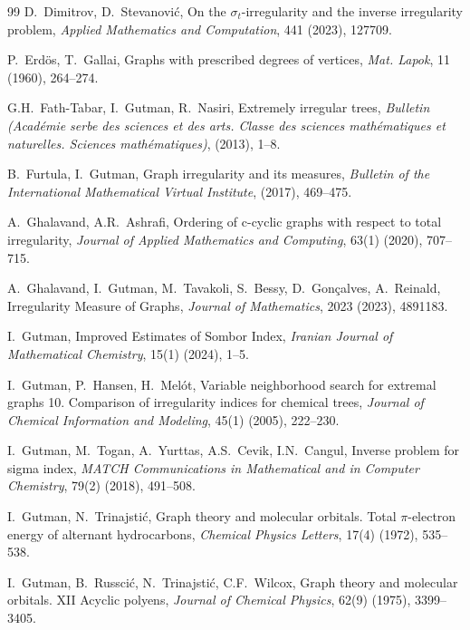 \documentclass[12pt]{amsart}
\begin{document}
\begin{thebibliography}{99}
D.~Dimitrov, D.~Stevanovi\'c,
\newblock On the $\sigma_t$-irregularity and the inverse irregularity problem,
\newblock \emph{Applied Mathematics and Computation}, 441 (2023), 127709.

P.~Erd\"{o}s, T.~Gallai,
\newblock Graphs with prescribed degrees of vertices,
\newblock \emph{Mat. Lapok}, 11 (1960), 264–274.

G.H.~Fath-Tabar, I.~Gutman, R.~Nasiri,
\newblock Extremely irregular trees,
\newblock \emph{Bulletin (Académie serbe des sciences et des arts. Classe des sciences mathématiques et naturelles. Sciences mathématiques)}, (2013), 1–8.

B.~Furtula, I.~Gutman,
\newblock Graph irregularity and its measures,
\newblock \emph{Bulletin of the International Mathematical Virtual Institute}, (2017), 469–475.

A.~Ghalavand, A.R.~Ashrafi,
\newblock Ordering of c-cyclic graphs with respect to total irregularity,
\newblock \emph{Journal of Applied Mathematics and Computing}, 63(1) (2020), 707–715.

A.~Ghalavand, I.~Gutman, M.~Tavakoli, S.~Bessy, D.~Gonçalves, A.~Reinald,
\newblock Irregularity Measure of Graphs,
\newblock \emph{Journal of Mathematics}, 2023 (2023), 4891183.

I.~Gutman,
\newblock Improved Estimates of Sombor Index,
\newblock \emph{Iranian Journal of Mathematical Chemistry}, 15(1) (2024), 1–5.

I.~Gutman, P.~Hansen, H.~Mel\'ot,
\newblock Variable neighborhood search for extremal graphs 10. Comparison of irregularity indices for chemical trees,
\newblock \emph{Journal of Chemical Information and Modeling}, 45(1) (2005), 222–230.

I.~Gutman, M.~Togan, A.~Yurttas, A.S.~Cevik, I.N.~Cangul,
\newblock Inverse problem for sigma index,
\newblock \emph{MATCH Communications in Mathematical and in Computer Chemistry}, 79(2) (2018), 491–508.

I.~Gutman, N.~Trinajsti\'c,
\newblock Graph theory and molecular orbitals. Total $\pi$-electron energy of alternant hydrocarbons,
\newblock \emph{Chemical Physics Letters}, 17(4) (1972), 535–538.

I.~Gutman, B.~Russci\'c, N.~Trinajsti\'c, C.F.~Wilcox,
\newblock Graph theory and molecular orbitals. XII Acyclic polyens,
\newblock \emph{Journal of Chemical Physics}, 62(9) (1975), 3399–3405.


\end{thebibliography}
\end{document}
